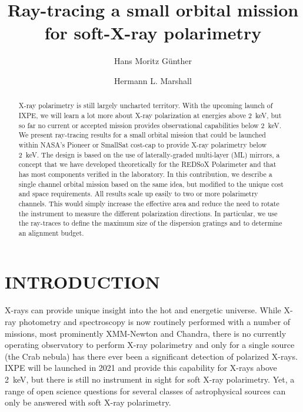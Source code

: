 \documentclass[]{spie}  %
\title{Ray-tracing a small orbital mission for soft-X-ray polarimetry}
\author[a]{Hans Moritz G\"unther}
\author[a]{Hermann L. Marshall}
\affil[a]{MIT Kavli Institute for Astrophysics and Space Research, Massachusetts Institute of Technology, Cambridge, MA 02139, USA}
\begin{document}
 
\maketitle

\begin{abstract}
X-ray polarimetry is still largely uncharted territory. With the
upcoming launch of IXPE, we will learn a lot more about X-ray
polarization at energies above 2~keV, but so far no current or
accepted mission provides observational capabilities below 2~keV. We
present ray-tracing results for a small orbital mission that could be
launched within NASA's Pioneer or SmallSat cost-cap to provide X-ray
polarimetry below 2~keV. The design is based on the use of
laterally-graded multi-layer (ML) mirrors, a concept that we have
developed theoretically for the REDSoX Polarimeter\cite{redsox} and
that has most components verified in the laboratory.  In this
contribution, we describe a single channel orbital mission based on
the same idea, but modified to the unique cost and space
requirements. All results scale up easily to two or more polarimetry
channels. This would simply increase the effective area and reduce the
need to rotate the instrument to measure the different polarization
directions. In particular, we use the ray-traces to define the maximum
size of the dispersion gratings and to determine an alignment budget.

\end{abstract}


\section{INTRODUCTION}
\label{sec:intro}
X-rays can provide unique insight into the hot and energetic
universe. While X-ray photometry and spectroscopy is now routinely
performed with a number of missions, most prominently XMM-Newton and
Chandra, there is no currently operating observatory to perform X-ray
polarimetry and only for a single source (the Crab nebula) has there
ever been a significant detection of polarized
X-rays\cite{1972ApJ...174L...1N,1978ApJ...220L.117W}.  IXPE\cite{IXPE}
will be launched in 2021 and provide this capability for X-rays above
2~keV, but there is still no instrument in sight for soft X-ray
polarimetry. Yet, a range of open science questions for several
classes of astrophysical sources can only be answered with soft X-ray
polarimetry.
\end{document}
